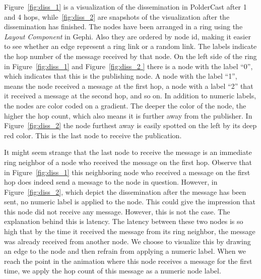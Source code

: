 Figure~\ref{fig:diss_1} is a visualization of the dissemination in
PolderCast after 1 and 4 hops, while~\ref{fig:diss_2} are snapshots of
the visualization after the dissemination has finished.  The nodes have
been arranged in a ring using the \emph{Layout Component} in Gephi. Also
they are ordered by node id, making it easier to see whether an edge
represent a ring link or a random link. The labels indicate the hop
number of the message received by that node. On the left side of the
ring in Figure~\ref{fig:diss_1} and Figure~\ref{fig:diss_2 } there is a
node with the label ``0'', which indicates that this is the publishing
node. A node with the label ``1'', means the node received a message at
the first hop, a node with a label ``2'' that it received a message at
the second hop, and so on. In addition to numeric labels, the nodes are
color coded on a gradient. The deeper the color of the node, the higher
the hop count, which also means it is further away from the publisher. In
Figure~\ref{fig:diss_2} the node furthest away is easily spotted on the
left by its deep red color. This is the last node to receive the
publication.

It might seem strange that the last node to receive the message is an
immediate ring neighbor of a node who received the message on the first
hop. Observe that in Figure~\ref{fig:diss_1} this neighboring node who
received a message on the first hop does indeed send a message to the
node in question. However, in Figure~\ref{fig:diss_2}, which depict the
dissemination after the message has been sent, no numeric label is
applied to the node. This could give the impression that this node did
not receive any message. However, this is not the case. The explanation
behind this is latency. The latency between these two nodes is so high
that by the time it received the message from its ring neighbor, the
message was already received from another node. We choose to visualize
this by drawing an edge to the node and then refrain from applying a
numeric label. When we reach the point in the animation where this node
receives a message for the first time, we apply the hop count of this
message as a numeric node label.


